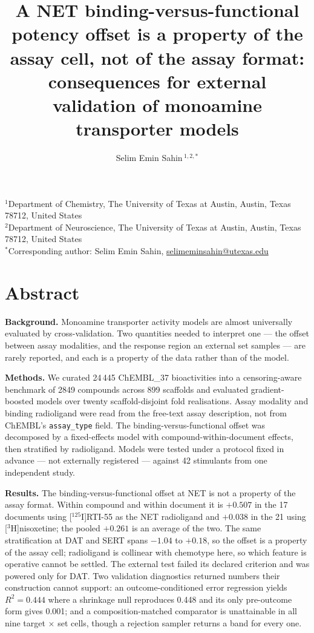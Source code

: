 \documentclass[11pt,a4paper]{article}
\title{\bfseries A NET binding-versus-functional potency offset is a property of the
assay cell, not of the assay format: consequences for external validation of monoamine
transporter models}
\author{Selim Emin Sahin\,$^{1,2,*}$}
\date{}
\begin{document}
\maketitle

\noindent$^{1}$Department of Chemistry, The University of Texas at Austin, Austin,
Texas 78712, United States\\
$^{2}$Department of Neuroscience, The University of Texas at Austin, Austin,
Texas 78712, United States\\[4pt]
$^{*}$Corresponding author: Selim Emin Sahin, \href{mailto:selimeminsahin@utexas.edu}{selimeminsahin@utexas.edu}

\section*{Abstract}

\textbf{Background.} Monoamine transporter activity models are almost universally
evaluated by cross-validation. Two quantities needed to interpret one --- the offset
between assay modalities, and the response region an external set samples --- are rarely
reported, and each is a property of the data rather than of the model.

\textbf{Methods.} We curated 24\,445 ChEMBL\_37 bioactivities into a censoring-aware
benchmark of 2849 compounds across 899 scaffolds and evaluated gradient-boosted models
over twenty scaffold-disjoint fold realisations. Assay modality and binding radioligand
were read from the free-text assay description, not from ChEMBL's
\texttt{assay\_type} field. The binding-versus-functional offset was decomposed by a
fixed-effects model with compound-within-document effects, then stratified by radioligand.
Models were tested under a protocol fixed in advance --- not externally registered ---
against 42 stimulants from one independent study.

\textbf{Results.} The binding-versus-functional offset at NET is not a property of the
assay format. Within compound and within document it is $+0.507$ in the 17 documents
using [$^{125}$I]RTI-55 as the NET radioligand and $+0.038$ in the 21 using
[$^{3}$H]nisoxetine; the pooled $+0.261$ is an average of the two. The same stratification
at DAT and SERT spans $-1.04$ to $+0.18$, so the offset is a property of the assay cell;
radioligand is collinear with chemotype here, so which feature is operative cannot be
settled. The external test failed its declared criterion and was powered only for DAT. Two validation diagnostics returned numbers their construction cannot support: an
outcome-conditioned error regression yields $R^{2}=0.444$ where a shrinkage null
reproduces 0.448 and its only pre-outcome form gives 0.001; and a composition-matched
comparator is unattainable in all nine target $\times$ set cells, though a rejection
sampler returns a band for every one.
\end{document}
